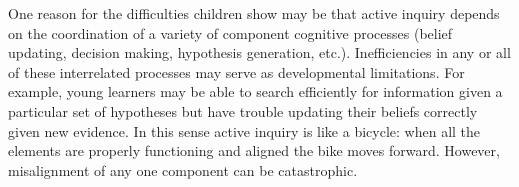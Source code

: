 \documentclass[10pt,letterpaper]{article}
\begin{document}
One reason for the difficulties children show may be that 
active inquiry depends on the coordination of a variety of 
component cognitive processes (belief updating, decision making, hypothesis generation, etc.).  
Inefficiencies in any or all of these interrelated processes may serve as developmental limitations.  
For example, young learners may be able to search efficiently for information given a particular 
set of hypotheses but have trouble updating their beliefs correctly given new evidence.
In this sense active inquiry is like a bicycle: when all the elements are properly functioning
and aligned the bike moves forward.  However, misalignment of any one component can
be catastrophic.

%





%
\end{document}
